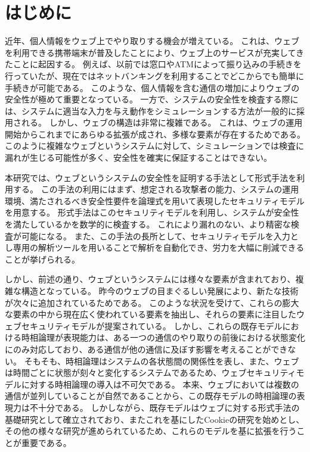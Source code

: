 \documentclass[12pt,a4paper]{jbook}
\begin{document}
\newpage

\chapter{はじめに}
近年、個人情報をウェブ上でやり取りする機会が増えている。
これは、ウェブを利用できる携帯端末が普及したことにより、ウェブ上のサービスが充実してきたことに起因する。
例えば、以前では窓口やATMによって振り込みの手続きを行っていたが、現在ではネットバンキングを利用することでどこからでも簡単に手続きが可能である。
このような、個人情報を含む通信の増加によりウェブの安全性が極めて重要となっている。
一方で、システムの安全性を検査する際には、システムに適当な入力を与え動作をシミュレーションする方法が一般的に採用される。
しかし、ウェブの構造は非常に複雑である。
これは、ウェブの運用開始からこれまでにあらゆる拡張が成され、多様な要素が存在するためである。
このように複雑なウェブというシステムに対して、シミュレーションでは検査に漏れが生じる可能性が多く、安全性を確実に保証することはできない。

本研究では、ウェブというシステムの安全性を証明する手法として形式手法を利用する。
この手法の利用にはまず、想定される攻撃者の能力、システムの運用環境、満たされるべき安全性要件を論理式を用いて表現したセキュリティモデルを用意する。
形式手法はこのセキュリティモデルを利用し、システムが安全性を満たしているかを数学的に検査する。
これにより漏れのない、より精密な検査が可能になる。
また、この手法の長所として、セキュリティモデルを入力とし専用の解析ツールを用いることで解析を自動化でき、労力を大幅に削減できることが挙げられる。

しかし、前述の通り、ウェブというシステムには様々な要素が含まれており、複雑な構造となっている。
昨今のウェブの目まぐるしい発展により、新たな技術が次々に追加されているためである。
このような状況を受けて、これらの膨大な要素の中から現在広く使われている要素を抽出し、それらの要素に注目したウェブセキュリティモデルが提案されている\cite{based-model,cookie-model}。
しかし、これらの既存モデルにおける時相論理が表現能力は、ある一つの通信のやり取りの前後における状態変化にのみ対応しており、ある通信が他の通信に及ぼす影響を考えることができない。
そもそも、時相論理はシステムの各状態間の関係性を表し、また、ウェブは時間ごとに状態が刻々と変化するシステムであるため、ウェブセキュリティモデルに対する時相論理の導入は不可欠である。
本来、ウェブにおいては複数の通信が並列していることが自然であることから、この既存モデルの時相論理の表現力は不十分である。
しかしながら、既存モデル\cite{based-model}はウェブに対する形式手法の基礎研究として確立されており、またこれを基にしたCookieの研究\cite{cookie-model}を始めとし、その他の様々な研究\cite{chaitanya2017formal, bagheri2016practical, chen2015aspire, nelson2013aluminum, somorovsky2011all}が進められているため、これらのモデルを基に拡張を行うことが重要である。
\end{document}
